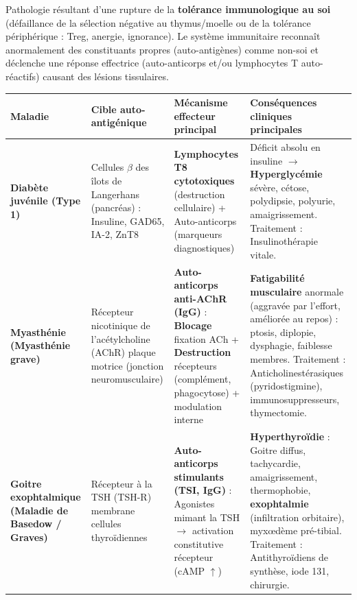\documentclass[11pt]{article}
\newcounter{popsec}
\newcounter{popsub}
\newcommand{\courssub}[1]{%
  \stepcounter{popsub}%
  \par\vspace{9pt}\noindent{\popxbold\fontsize{11.5}{13}\selectfont\color{popink}{\color{poporange}\thepopsec.\thepopsub}\hspace{6pt}#1}\par\nopagebreak\vspace{4pt}
}
\begin{document}
\courssub{Les maladies auto-immunes}

\begin{definition}
Pathologie résultant d'une rupture de la \textbf{tolérance immunologique au soi} (défaillance de la sélection négative au thymus/moelle ou de la tolérance périphérique : Treg, anergie, ignorance). Le système immunitaire reconnaît anormalement des constituants propres (auto-antigènes) comme non-soi et déclenche une réponse effectrice (auto-anticorps et/ou lymphocytes T auto-réactifs) causant des lésions tissulaires.
\end{definition}

\begin{propriete}
\begin{center}
\begin{tabularx}{\linewidth}{|l|X|X|X|}\hline
\rowcolor{popblueL} \textbf{Maladie} & \textbf{Cible auto-antigénique} & \textbf{Mécanisme effecteur principal} & \textbf{Conséquences cliniques principales} \\ \hline
\textbf{Diabète juvénile (Type 1)} & Cellules $\beta$ des îlots de Langerhans (pancréas) : Insuline, GAD65, IA-2, ZnT8 & \textbf{Lymphocytes T8 cytotoxiques} (destruction cellulaire) + Auto-anticorps (marqueurs diagnostiques) & Déficit absolu en insuline $\rightarrow$ \textbf{Hyperglycémie} sévère, cétose, polydipsie, polyurie, amaigrissement. Traitement : Insulinothérapie vitale. \\ \hline
\textbf{Myasthénie (Myasthénie grave)} & Récepteur nicotinique de l'acétylcholine (AChR) plaque motrice (jonction neuromusculaire) & \textbf{Auto-anticorps anti-AChR (IgG)} : \textbf{Blocage} fixation ACh + \textbf{Destruction} récepteurs (complément, phagocytose) + modulation interne & \textbf{Fatigabilité musculaire} anormale (aggravée par l'effort, améliorée au repos) : ptosis, diplopie, dysphagie, faiblesse membres. Traitement : Anticholinestérasiques (pyridostigmine), immunosuppresseurs, thymectomie. \\ \hline
\textbf{Goitre exophtalmique (Maladie de Basedow / Graves)} & Récepteur à la TSH (TSH-R) membrane cellules thyroïdiennes & \textbf{Auto-anticorps \textbf{stimulants} (TSI, IgG)} : Agonistes mimant la TSH $\rightarrow$ activation constitutive récepteur (cAMP $\uparrow$) & \textbf{Hyperthyroïdie} : Goitre diffus, tachycardie, amaigrissement, thermophobie, \textbf{exophtalmie} (infiltration orbitaire), myxœdème pré-tibial. Traitement : Antithyroïdiens de synthèse, iode 131, chirurgie. \\ \hline

\end{tabularx}
\end{center}
\end{propriete}
\end{document}
